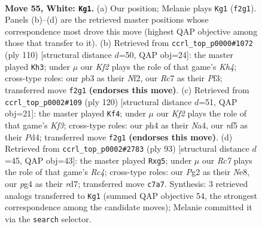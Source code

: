 \documentclass[11pt]{article}
\begin{document}
\clearpage

\begin{figure}[p]\centering
\begin{subfigure}{0.46\textwidth}\centering
\resizebox{\linewidth}{!}{%
\newchessgame
\chessboard[
  setfen={1r6/2R5/3pk3/5n2/6pp/1p6/3RNKPr/8 w - - 0 55},
  showmover=false,
  pgfstyle=straightmove, color=movearrow, markmove={f2-g1}
]}
\caption{}
\end{subfigure}\hfill
\begin{subfigure}{0.46\textwidth}\centering
\resizebox{\linewidth}{!}{%
\newchessgame
\chessboard[
  setfen={8/8/r6p/P2kpn1P/R4p1K/5P2/5N2/8 w - - 2 56},
  showmover=false,
  pgfstyle=straightmove, color=movearrow, markmove={h4-h3}
]}
\caption{}
\end{subfigure}
\\[4pt]
\begin{subfigure}{0.46\textwidth}\centering
\resizebox{\linewidth}{!}{%
\newchessgame
\chessboard[
  setfen={8/pr2n3/R4pk1/3p4/N1pP4/4PK2/1P6/8 w - - 34 61},
  showmover=false,
  pgfstyle=straightmove, color=movearrow, markmove={f3-f4}
]}
\caption{}
\end{subfigure}\hfill
\begin{subfigure}{0.46\textwidth}\centering
\resizebox{\linewidth}{!}{%
\newchessgame
\chessboard[
  setfen={R3nk2/3R4/p5p1/2r3P1/P2N4/1P2r3/1K6/8 b - - 20 47},
  showmover=false,
  pgfstyle=straightmove, color=movearrow, markmove={c5-g5}
]}
\caption{}
\end{subfigure}
\caption{\textbf{Move 55, White: \texttt{Kg1}.} (a) Our position; Melanie plays \texttt{Kg1} (\texttt{f2g1}). Panels (b)--(d) are the retrieved master positions whose correspondence most drove this move (highest QAP objective among those that transfer to it). (b) Retrieved from \texttt{ccrl\_top\_p0000\#1072} (ply 110) [structural distance $d$=50, QAP obj=24]: the master played \texttt{Kh3}; under $\mu$ our \emph{Kf2} plays the role of that game's \emph{Kh4}; cross-type roles: our \emph{p}b3 as their \emph{N}f2, our \emph{R}c7 as their \emph{P}f3; transferred move \texttt{f2g1} \textbf{(endorses this move)}. (c) Retrieved from \texttt{ccrl\_top\_p0002\#109} (ply 120) [structural distance $d$=51, QAP obj=21]: the master played \texttt{Kf4}; under $\mu$ our \emph{Kf2} plays the role of that game's \emph{Kf3}; cross-type roles: our \emph{p}h4 as their \emph{N}a4, our \emph{n}f5 as their \emph{P}d4; transferred move \texttt{f2g1} \textbf{(endorses this move)}. (d) Retrieved from \texttt{ccrl\_top\_p0002\#2783} (ply 93) [structural distance $d$=45, QAP obj=43]: the master played \texttt{Rxg5}; under $\mu$ our \emph{Rc7} plays the role of that game's \emph{Rc4}; cross-type roles: our \emph{P}g2 as their \emph{N}e8, our \emph{p}g4 as their \emph{r}d7; transferred move \texttt{c7a7}. Synthesis: 3 retrieved analogs transferred to \texttt{Kg1} (summed QAP objective 54, the strongest correspondence among the candidate moves); Melanie committed it via the \texttt{search} selector.}
\label{fig:thought-m108}
\end{figure}
\end{document}
